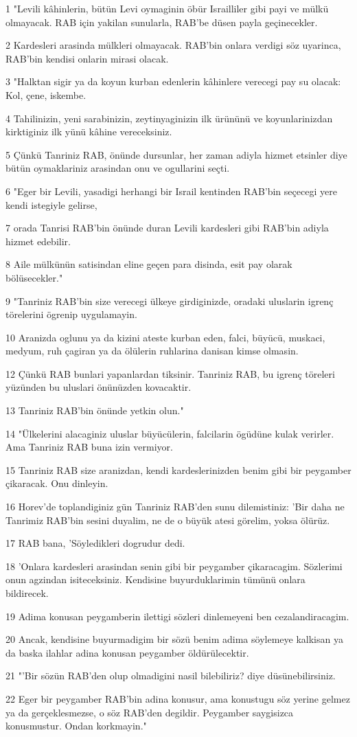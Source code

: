 \par 1 "Levili kâhinlerin, bütün Levi oymaginin öbür Israilliler gibi payi ve mülkü olmayacak. RAB için yakilan sunularla, RAB'be düsen payla geçinecekler.
\par 2 Kardesleri arasinda mülkleri olmayacak. RAB'bin onlara verdigi söz uyarinca, RAB'bin kendisi onlarin mirasi olacak.
\par 3 "Halktan sigir ya da koyun kurban edenlerin kâhinlere verecegi pay su olacak: Kol, çene, iskembe.
\par 4 Tahilinizin, yeni sarabinizin, zeytinyaginizin ilk ürününü ve koyunlarinizdan kirktiginiz ilk yünü kâhine vereceksiniz.
\par 5 Çünkü Tanriniz RAB, önünde dursunlar, her zaman adiyla hizmet etsinler diye bütün oymaklariniz arasindan onu ve ogullarini seçti.
\par 6 "Eger bir Levili, yasadigi herhangi bir Israil kentinden RAB'bin seçecegi yere kendi istegiyle gelirse,
\par 7 orada Tanrisi RAB'bin önünde duran Levili kardesleri gibi RAB'bin adiyla hizmet edebilir.
\par 8 Aile mülkünün satisindan eline geçen para disinda, esit pay olarak bölüsecekler."
\par 9 "Tanriniz RAB'bin size verecegi ülkeye girdiginizde, oradaki uluslarin igrenç törelerini ögrenip uygulamayin.
\par 10 Aranizda oglunu ya da kizini ateste kurban eden, falci, büyücü, muskaci, medyum, ruh çagiran ya da ölülerin ruhlarina danisan kimse olmasin.
\par 12 Çünkü RAB bunlari yapanlardan tiksinir. Tanriniz RAB, bu igrenç töreleri yüzünden bu uluslari önünüzden kovacaktir.
\par 13 Tanriniz RAB'bin önünde yetkin olun."
\par 14 "Ülkelerini alacaginiz uluslar büyücülerin, falcilarin ögüdüne kulak verirler. Ama Tanriniz RAB buna izin vermiyor.
\par 15 Tanriniz RAB size aranizdan, kendi kardeslerinizden benim gibi bir peygamber çikaracak. Onu dinleyin.
\par 16 Horev'de toplandiginiz gün Tanriniz RAB'den sunu dilemistiniz: 'Bir daha ne Tanrimiz RAB'bin sesini duyalim, ne de o büyük atesi görelim, yoksa ölürüz.
\par 17 RAB bana, 'Söyledikleri dogrudur dedi.
\par 18 'Onlara kardesleri arasindan senin gibi bir peygamber çikaracagim. Sözlerimi onun agzindan isiteceksiniz. Kendisine buyurduklarimin tümünü onlara bildirecek.
\par 19 Adima konusan peygamberin ilettigi sözleri dinlemeyeni ben cezalandiracagim.
\par 20 Ancak, kendisine buyurmadigim bir sözü benim adima söylemeye kalkisan ya da baska ilahlar adina konusan peygamber öldürülecektir.
\par 21 "'Bir sözün RAB'den olup olmadigini nasil bilebiliriz? diye düsünebilirsiniz.
\par 22 Eger bir peygamber RAB'bin adina konusur, ama konustugu söz yerine gelmez ya da gerçeklesmezse, o söz RAB'den degildir. Peygamber saygisizca konusmustur. Ondan korkmayin."

